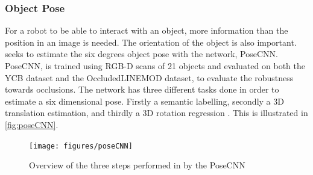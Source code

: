 \subsubsection{Object Pose}
For a robot to be able to interact with an object, more information than the position in an image is needed. The orientation of the object is also important. \cite{Xiang2017} seeks to estimate the six degrees object pose with the network, PoseCNN. PoseCNN, is trained using RGB-D scans of 21 objects and evaluated on both the YCB dataset and the OccludedLINEMOD dataset, to evaluate the robustness towards occlusions. The network has three different tasks done in order to estimate a six dimensional pose. Firstly a semantic labelling, secondly a 3D translation estimation, and thirdly a 3D rotation regression \citep{Xiang2017}. This is illustrated in \autoref{fig:poseCNN}.

\begin{figure}
	\centering
	\texttt{[image: figures/poseCNN]}
	\caption{Overview of the three steps performed in by the PoseCNN \citep{Xiang2017}}
	\label{fig:poseCNN}
\end{figure}